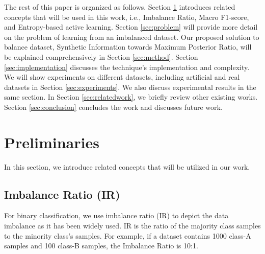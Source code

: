 \documentclass[final,5p,times, twocolumn]{elsarticle}
\newcommand{\MethodnameLong}{Synthetic Information towards Maximum Posterior Ratio}
\begin{document}
	
	The rest of this paper is organized as follows. Section \ref{sec:preliminaries} introduces related concepts that will be used in this work, i.e., Imbalance Ratio, Macro F1-score, and Entropy-based active learning. Section \ref{sec:problem} will provide more detail on the problem of learning from an imbalanced dataset. Our proposed solution to balance dataset, \MethodnameLong, will be explained comprehensively in Section \ref{sec:method}. Section \ref{sec:implementation} discusses the technique's implementation and complexity. We will show experiments on different datasets, including artificial and real datasets in Section \ref{sec:experiments}. We also discuss experimental results in the same section. In Section \ref{sec:relatedwork}, we briefly review other existing works. Section \ref{sec:conclusion} concludes the work and discusses future work. 
	
	
	\section{Preliminaries}
	\label{sec:preliminaries}       
	In this section, we introduce related concepts that will be utilized in our work. 
	

	
	\subsection{Imbalance Ratio (IR)}
	For binary classification, we use imbalance ratio (IR) to depict the data imbalance as it has been widely used. IR is the ratio of the majority class samples to the minority class's samples. For example, if a dataset contains 1000 class-A samples and 100 class-B samples, the Imbalance Ratio is 10:1.   
	
\end{document}
